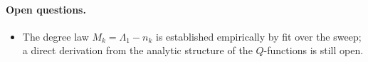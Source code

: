 \documentclass[12pt]{article}
\begin{document}
\paragraph{Open questions.}
\begin{itemize}
  \item The degree law $M_k=\Lambda_1-n_k$ is established empirically by
    fit over the sweep; a direct derivation from the analytic structure
    of the $Q$-functions is still open.
\end{itemize}
\end{document}
